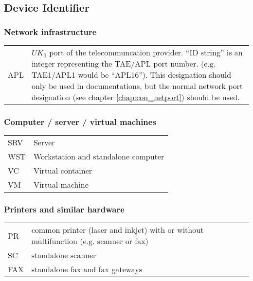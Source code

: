 %
%
%
%
%
%
%

\subsection{Device Identifier}
\label{chap:con_dev-identify}


\subsubsection{Network infrastructure}

\begin{tabular}{p{1.4cm}p{15cm}}
	APL	& $UK_0$ port of the telecommuncation provider. ``ID string'' is an
		integer representing the TAE/APL port number. (e.g. TAE1/APL1 would be
		``APL16''). This designation should only be used in documentations, but
		the normal network port designation (see chapter \ref{chap:con_netport})
		should be used.
\end{tabular}



\subsubsection{Computer / server / virtual machines}

\begin{tabular}{p{1.4cm}p{15cm}}
	SRV	& Server \\

	WST	& Workstation and standalone computer \\

	VC	& Virtual container \\

	VM	& Virtual machine \\
\end{tabular}



\subsubsection{Printers and similar hardware}

\begin{tabular}{p{1.4cm}p{15cm}}
	PR	& common printer (laser and inkjet) with or without multifunction (e.g.
		scanner or fax) \\

	SC	& standalone scanner \\

	FAX	& standalone fax and fax gateways \\
\end{tabular}
